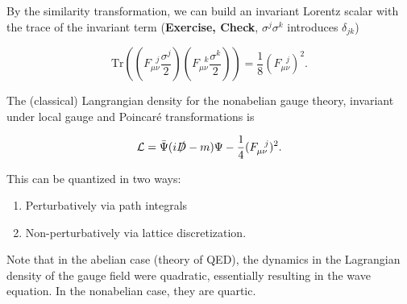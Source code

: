 \noindent By the similarity transformation, we can build an invariant Lorentz scalar with the trace of the invariant term (\textbf{Exercise, Check}, $\sigma^j \sigma^k$ introduces $\delta_{jk}$)

\begin{equation}
\text{Tr}\left( \left( F_{\mu\nu}^{\,\,\,\,j} \frac{\sigma^j}{2} \right)\left( F_{\mu\nu}^{\,\,\,\,k} \frac{\sigma^k}{2} \right) \right)= \frac{1}{8} (F_{\mu\nu}^{\,\,\,\,j})^2.
\end{equation}

\noindent The (classical) Langrangian density for the nonabelian gauge theory, invariant under local gauge and Poincar\'e transformations is

\begin{equation}
\mathcal{L} = \bar{\Psi} (i \slashed{D} - m) \Psi - \frac{1}{4} (F_{\mu\nu}^{\,\,\,\,j})^2.
\end{equation}

\noindent This can be quantized in two ways:

\begin{enumerate}
\item Perturbatively via path integrals
\item Non-perturbatively via lattice discretization.
\end{enumerate}

\noindent Note that in the abelian case (theory of QED), the dynamics in the Lagrangian density of the gauge field were quadratic, essentially resulting in the wave equation. In the nonabelian case, they are quartic.
